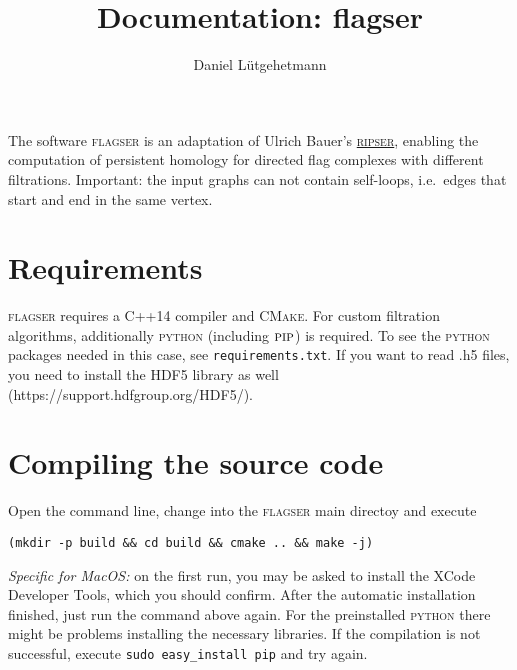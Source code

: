 \documentclass{amsart}
\theoremstyle{definition}
\begin{document}
\title{Documentation: flagser}

\author{Daniel Lütgehetmann}
\address{University of Aberdeen, Aberdeen, United Kingdom}

\maketitle

\noindent
The software \textsc{flagser} is an adaptation of Ulrich Bauer's
\href{https://github.com/Ripser/ripser}{\textsc{ripser}}, enabling the computation of persistent
homology for directed flag complexes with different filtrations.
Important: the input graphs can not contain self-loops, i.e.\ edges that start and end in the same
vertex.

\section{Requirements}
\noindent
\textsc{flagser} requires a C++14 compiler and \textsc{CMake}.
For custom filtration algorithms, additionally \textsc{python} (including $\textsc{pip}$) is required.
To see the \textsc{python} packages needed in this case, see \texttt{requirements.txt}.
If you want to read .h5 files, you need to install the HDF5 library as well (https://support.hdfgroup.org/HDF5/).

\section{Compiling the source code}
\noindent
Open the command line, change into the \textsc{flagser} main directoy and execute

\vspace{1em}

\begin{verbatim}(mkdir -p build && cd build && cmake .. && make -j)\end{verbatim}

\vspace{1em}

\noindent
\textit{Specific for MacOS:} on the first run, you may be asked to install the XCode Developer Tools, which you should confirm.
After the automatic installation finished, just run the command above again.
For the preinstalled \textsc{python} there might be problems installing the necessary libraries.
If the compilation is not successful, execute \texttt{sudo easy\_install pip} and try again.
\end{document}
